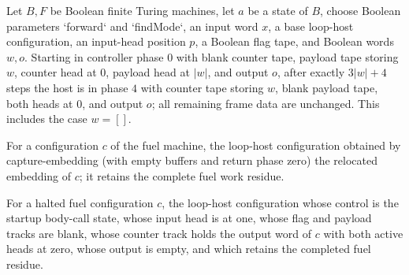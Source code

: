\begin{lemma}
\label{Turing.FinTM.loopHost_fuel_setup}
\leanok
{}
Let $B,F$ be Boolean finite Turing machines, let $a$ be a state of $B$, choose Boolean
parameters `forward` and `findMode`, an input word $x$, a base loop-host configuration,
an input-head position $p$, a Boolean flag tape, and Boolean words $w,o$. Starting in
controller phase $0$ with blank counter tape, payload tape storing $w$, counter head at
$0$, payload head at $|w|$, and output $o$, after exactly $3|w|+4$ steps the host is in
phase $4$ with counter tape storing $w$, blank payload tape, both heads at $0$, and
output $o$; all remaining frame data are unchanged. This includes the case $w=[]$.
\end{lemma}

\begin{definition}
\label{Turing.FinTM.loopFuelCaptured}
\leanok
{}
For a configuration $c$ of the fuel machine, the loop-host configuration obtained by
capture-embedding (with empty buffers and return phase zero) the relocated embedding of
$c$; it retains the complete fuel work residue.
\end{definition}

\begin{definition}
\label{Turing.FinTM.loopReady}
\leanok
{}
For a halted fuel configuration $c$, the loop-host configuration whose control is the
startup body-call state, whose input head is at one, whose flag and payload tracks are
blank, whose counter track holds the output word of $c$ with both active heads at zero,
whose output is empty, and which retains the completed fuel residue.
\end{definition}

